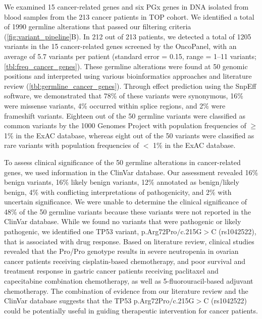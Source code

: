 We examined 15 cancer-related genes and six PGx genes in DNA isolated from blood samples from the 213 cancer patients in TOP cohort. We identified a total of 1990 germline alterations that passed our filtering criteria (\autoref{fig:variant_pipeline}B). In 212 out of 213 patients, we detected a total of 1205 variants in the 15 cancer-related genes screened by the OncoPanel, with an average of 5.7 variants per patient (standard error = 0.15, range = 1--11 variants; \autoref{tbl:freq_cancer_genes}). These germline alterations were found at 50 genomic positions and interpreted using various bioinformatics approaches and literature review (\autoref{tbl:germline_cancer_genes}). Through effect prediction using the SnpEff software, we demonstrated that 78\% of these variants were synonymous, 16\% were missense variants, 4\% occurred within splice regions, and 2\% were frameshift variants. Eighteen out of the 50 germline variants were classified as common variants by the 1000 Genomes Project with population frequencies of $\geq$ 1\% in the ExAC database, whereas eight out of the 50 variants were classified as rare variants with population frequencies of $<$ 1\% in the ExAC database.

To assess clinical significance of the 50 germline alterations in cancer-related genes, we used information in the ClinVar database. Our assessment revealed 16\% benign variants, 16\% likely benign variants, 12\% annotated as benign/likely benign, 4\% with conflicting interpretations of pathogenicity, and 2\% with uncertain significance. We were unable to determine the clinical significance of 48\% of the 50 germline variants because these variants were not reported in the ClinVar database. While we found no variants that were pathogenic or likely pathogenic, we identified one TP53 variant, p.Arg72Pro$/$c.215G$>$C (rs1042522), that is associated with drug response. Based on literature review, clinical studies revealed that the Pro/Pro genotype results in severe neutropenia in ovarian cancer patients receiving cisplatin-based chemotherapy, and poor survival and treatment response in gastric cancer patients receiving paclitaxel and capecitabine combination chemotherapy, as well as 5-fluorouracil-based adjuvant chemotherapy. The combination of evidence from our literature review and the ClinVar database suggests that the TP53 p.Arg72Pro$/$c.215G$>$C (rs1042522) could be potentially useful in guiding therapeutic intervention for cancer patients.

